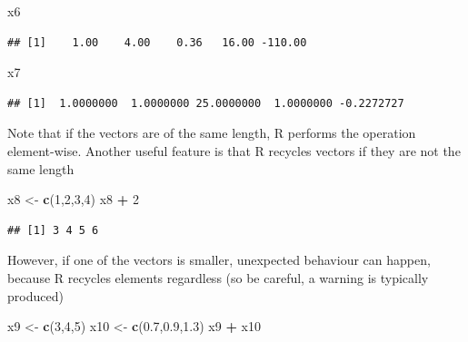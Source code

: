 \documentclass[]{book}
\newenvironment{Shaded}{\begin{snugshade}}{\end{snugshade}}
\newcommand{\KeywordTok}[1]{\textcolor[rgb]{0.13,0.29,0.53}{\textbf{#1}}}
\newcommand{\DecValTok}[1]{\textcolor[rgb]{0.00,0.00,0.81}{#1}}
\newcommand{\FloatTok}[1]{\textcolor[rgb]{0.00,0.00,0.81}{#1}}
\newcommand{\StringTok}[1]{\textcolor[rgb]{0.31,0.60,0.02}{#1}}
\newcommand{\OperatorTok}[1]{\textcolor[rgb]{0.81,0.36,0.00}{\textbf{#1}}}
\newcommand{\NormalTok}[1]{#1}
\theoremstyle{definition}
\theoremstyle{definition}
\theoremstyle{remark}
\begin{document}
\begin{Shaded}
\begin{Highlighting}[]
\NormalTok{x6}
\end{Highlighting}
\end{Shaded}

\begin{verbatim}
## [1]    1.00    4.00    0.36   16.00 -110.00
\end{verbatim}

\begin{Shaded}
\begin{Highlighting}[]
\NormalTok{x7}
\end{Highlighting}
\end{Shaded}

\begin{verbatim}
## [1]  1.0000000  1.0000000 25.0000000  1.0000000 -0.2272727
\end{verbatim}

Note that if the vectors are of the same length, R performs the
operation element-wise. Another useful feature is that R recycles
vectors if they are not the same length

\begin{Shaded}
\begin{Highlighting}[]
\NormalTok{x8 <-}\StringTok{ }\KeywordTok{c}\NormalTok{(}\DecValTok{1}\NormalTok{,}\DecValTok{2}\NormalTok{,}\DecValTok{3}\NormalTok{,}\DecValTok{4}\NormalTok{)}
\NormalTok{x8 }\OperatorTok{+}\StringTok{ }\DecValTok{2}
\end{Highlighting}
\end{Shaded}

\begin{verbatim}
## [1] 3 4 5 6
\end{verbatim}

However, if one of the vectors is smaller, unexpected behaviour can
happen, because R recycles elements regardless (so be careful, a warning
is typically produced)

\begin{Shaded}
\begin{Highlighting}[]
\NormalTok{x9 <-}\StringTok{ }\KeywordTok{c}\NormalTok{(}\DecValTok{3}\NormalTok{,}\DecValTok{4}\NormalTok{,}\DecValTok{5}\NormalTok{)}
\NormalTok{x10 <-}\StringTok{ }\KeywordTok{c}\NormalTok{(}\FloatTok{0.7}\NormalTok{,}\FloatTok{0.9}\NormalTok{,}\FloatTok{1.3}\NormalTok{)}
\NormalTok{x9 }\OperatorTok{+}\StringTok{ }\NormalTok{x10}
\end{Highlighting}
\end{Shaded}
\end{document}
